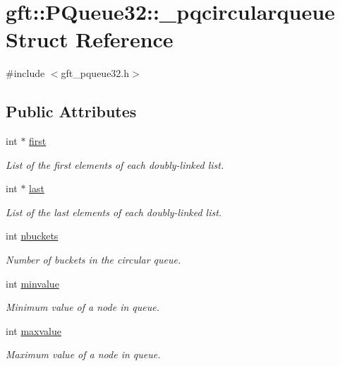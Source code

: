 \hypertarget{structgft_1_1PQueue32_1_1__pqcircularqueue}{}\section{gft\+:\+:P\+Queue32\+:\+:\+\_\+pqcircularqueue Struct Reference}
\label{structgft_1_1PQueue32_1_1__pqcircularqueue}


{\ttfamily \#include $<$gft\+\_\+pqueue32.\+h$>$}

\subsection*{Public Attributes}
\begin{DoxyCompactItemize}
\item 
int $\ast$ \hyperlink{structgft_1_1PQueue32_1_1__pqcircularqueue_abdbbf105caf80766f51fbc271d794ccb}{first}
\begin{DoxyCompactList}\small\item\em List of the first elements of each doubly-\/linked list. \end{DoxyCompactList}\item 
int $\ast$ \hyperlink{structgft_1_1PQueue32_1_1__pqcircularqueue_a9d495d213b910328120e4ed127dcbaec}{last}
\begin{DoxyCompactList}\small\item\em List of the last elements of each doubly-\/linked list. \end{DoxyCompactList}\item 
int \hyperlink{structgft_1_1PQueue32_1_1__pqcircularqueue_a622d6ecf851ae51f149bfd4cb8ba66e3}{nbuckets}
\begin{DoxyCompactList}\small\item\em Number of buckets in the circular queue. \end{DoxyCompactList}\item 
int \hyperlink{structgft_1_1PQueue32_1_1__pqcircularqueue_a98c5d1ecaf33142d7eac03f97485d4d7}{minvalue}
\begin{DoxyCompactList}\small\item\em Minimum value of a node in queue. \end{DoxyCompactList}\item 
int \hyperlink{structgft_1_1PQueue32_1_1__pqcircularqueue_a48f348ed1f639dd4970aa5f35feb81e0}{maxvalue}
\begin{DoxyCompactList}\small\item\em Maximum value of a node in queue. \end{DoxyCompactList}\end{DoxyCompactItemize}


